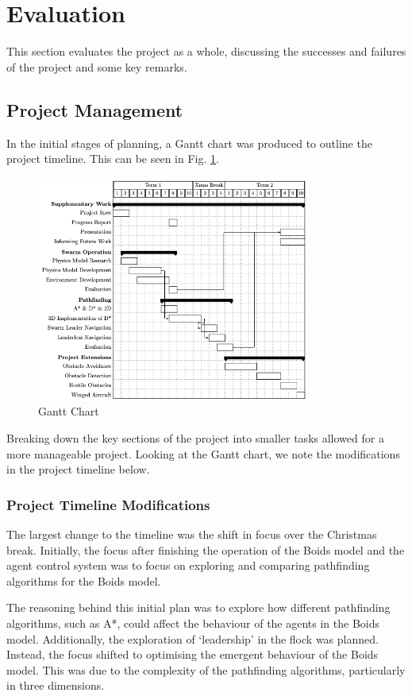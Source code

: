 \documentclass[12pt]{article}
\begin{document}
\section{Evaluation}
This section evaluates the project as a whole, discussing the successes and failures of the project and some key remarks.

\subsection{Project Management}
In the initial stages of planning, a Gantt chart was produced to outline the project timeline. This can be seen in Fig. \ref{fig:gantt-eval}. 

\begin{figure}[ht]
    \centering
    \includegraphics[width=0.8\textwidth]{gantt.png}
    \caption{Gantt Chart}
    \label{fig:gantt-eval}
\end{figure}

Breaking down the key sections of the project into smaller tasks allowed for a more manageable project. Looking at the Gantt chart, we note the modifications in the project timeline below.

\subsubsection{Project Timeline Modifications}
The largest change to the timeline was the shift in focus over the Christmas break. Initially, the focus after finishing the operation of the Boids model and the agent control system was to focus on exploring and comparing pathfinding algorithms for the Boids model.

The reasoning behind this initial plan was to explore how different pathfinding algorithms, such as A*, could affect the behaviour of the agents in the Boids model. Additionally, the exploration of `leadership' in the flock was planned. Instead, the focus shifted to optimising the emergent behaviour of the Boids model. This was due to the complexity of the pathfinding algorithms, particularly in three dimensions.
\end{document}

